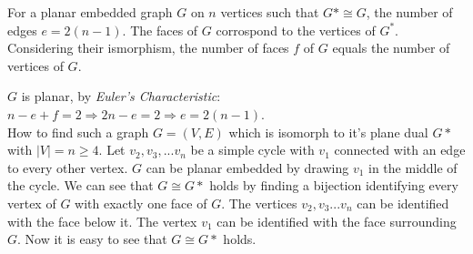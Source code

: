 \documentclass[a4paper]{article}
\begin{document}
	\begin{solution}{20}
		\begin{theorem}{For a planar embedded graph $G$ on $n$ vertices such that $G* \cong G$, the number of edges $e = 2(n - 1)$.}
			The faces of $G$ corrospond to the vertices of $G^*$. Considering their ismorphism, the number of faces $f$ of $G$ equals the number of vertices of $G$.
			
			$G$ is planar, by \emph{Euler's Characteristic}: $n - e + f = 2 \Rightarrow 2n - e = 2 \Rightarrow e = 2(n-1)$. \\
			How to find such a graph $G=(V,E)$ which is isomorph to it's plane dual $G*$ with $|V| = n \geq 4$. 
			Let $v_2,v_3,...v_n$ be a simple cycle with $v_1$ connected with an edge to every other vertex. 
			$G$ can be planar embedded by drawing $v_1$ in the middle of the cycle. 
			We can see that $G \cong G*$ holds by finding a bijection identifying every vertex of $G$ with exactly one face of $G$. 
			The vertices $v_2,v_3...v_n$ can be identified with the face below it. 
			The vertex $v_1$ can be identified with the face surrounding $G$. 
			Now it is easy to see that $G \cong G*$ holds. 
			\begin{center}
			\end{center}
			
		\end{theorem}
	\end{solution}
	
\end{document}
